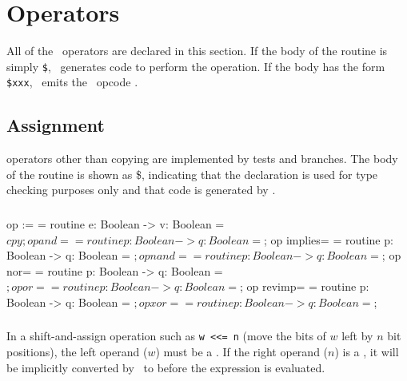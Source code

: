 \documentclass{scrartcl}
\begin{document}
\section{Operators}

All of the \desi\ operators are declared in this section.  If the body of the routine is simply \lstinline'$', \udc\ generates code to perform the operation.  If the body has the form \lstinline'$xxx', \udc\ emits the \dil\ opcode .

\subsection{Assignment}

 operators other than copying are implemented by tests and branches.  The body of the routine is shown as \$, indicating that the declaration is used for type checking purposes only and that code is generated by \udc.

\subsubsection{}
\begin{code}
op := = routine e: Boolean -> v: Boolean = $cpy;
op and= = routine p: Boolean -> q: Boolean = $;
op implies= = routine p: Boolean -> q: Boolean = $;
op nand= = routine p: Boolean -> q: Boolean = $;
op nor= = routine p: Boolean -> q: Boolean = $;
op or= = routine p: Boolean -> q: Boolean = $;
op revimp= = routine p: Boolean -> q: Boolean = $;
op xor= = routine p: Boolean -> q: Boolean = $;
\end{code}

\subsubsection{}

In a shift-and-assign operation such as \lstinline{w <<= n} (move the bits of $w$ left by $n$ bit positions), the left operand ($w$) must be a .  If the right operand ($n$) is  a , it will be implicitly converted by \udc\ to  before the expression is evaluated.

\end{document}
